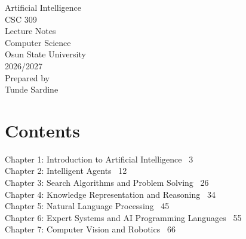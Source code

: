 \documentclass[12pt]{report}
\begin{document}
\begin{titlepage}
\thispagestyle{empty}
\centering
\vspace*{2cm}
{\LARGE Artificial Intelligence}\\[1cm]
{\Large CSC 309}\\[1cm]
{\Large Lecture Notes}\\[1.5cm]
Computer Science\\
Osun State University\\
2026/2027\\[2cm]
Prepared by\\
Tunde Sardine
\end{titlepage}

\pagestyle{plain}
\chapter*{Contents}
\vspace{0.5em}
\noindent
Chapter 1: Introduction to Artificial Intelligence \dotfill\ 3\\[0.6em]
Chapter 2: Intelligent Agents \dotfill\ 12\\[0.6em]
Chapter 3: Search Algorithms and Problem Solving \dotfill\ 26\\[0.6em]
Chapter 4: Knowledge Representation and Reasoning \dotfill\ 34\\[0.6em]
Chapter 5: Natural Language Processing \dotfill\ 45\\[0.6em]
Chapter 6: Expert Systems and AI Programming Languages \dotfill\ 55\\[0.6em]
Chapter 7: Computer Vision and Robotics \dotfill\ 66\\[0.6em]
\end{document}
